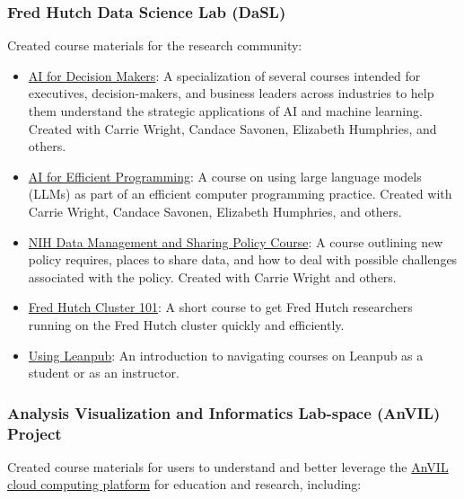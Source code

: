 \documentclass{cv}
\begin{document}
\subsubsection*{Fred Hutch Data Science Lab (DaSL)}

Created course materials for the research community: 

\begin{itemize}

\item \href{https://hutchdatascience.org/AI_for_Decision_Makers/}{AI for Decision Makers}: A specialization of several courses intended for executives, decision-makers, and business leaders across industries to help them understand the strategic applications of AI and machine learning. Created with Carrie Wright, Candace Savonen, Elizabeth Humphries, and others.

\item \href{https://hutchdatascience.org/AI_for_Efficient_Programming/}{AI for Efficient Programming}: A course on using large language models (LLMs) as part of an efficient computer programming practice. Created with Carrie Wright, Candace Savonen, Elizabeth Humphries, and others.

\item \href{https://hutchdatascience.org/NIH_Data_Sharing/}{NIH Data Management and Sharing Policy Course}: A course outlining new policy requires, places to share data, and how to deal with possible challenges associated with the policy. Created with Carrie Wright and others.

\item \href{https://hutchdatascience.org/FH_Cluster_Guide/}{Fred Hutch Cluster 101}: A short course to get Fred Hutch researchers running on the Fred Hutch cluster quickly and efficiently.

\item \href{https://hutchdatascience.org/Using_Leanpub/}{Using Leanpub}: An introduction to navigating courses on Leanpub as a student or as an instructor.

\end{itemize}

\subsubsection*{Analysis Visualization and Informatics Lab-space (AnVIL) Project}

Created course materials for users to understand and better leverage the \href{https://anvilproject.org/}{AnVIL cloud computing platform} for education and research, including: 
\end{document}
